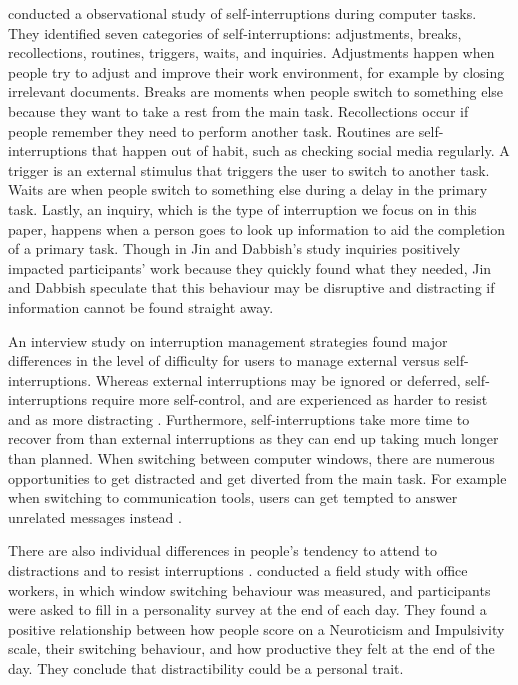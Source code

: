\citet{Jin2009} conducted a observational study of self-interruptions during computer tasks. They identified seven categories of self-interruptions: adjustments, breaks, recollections, routines, triggers, waits, and inquiries. Adjustments happen when people try to adjust and improve their work environment, for example by closing irrelevant documents. Breaks are moments when people switch to something else because they want to take a rest from the main task. Recollections occur if people remember they need to perform another task. Routines are self-interruptions that happen out of habit, such as checking social media regularly. A trigger is an external stimulus that triggers the user to switch to another task. Waits are when people switch to something else during a delay in the primary task. Lastly, an inquiry, which is the type of interruption we focus on in this paper, happens when a person goes to look up information to aid the completion of a primary task. Though in Jin and Dabbish’s study inquiries positively impacted participants’ work because they quickly found what they needed, Jin and Dabbish speculate that this behaviour may be disruptive and distracting if information cannot be found straight away.

An interview study on interruption management strategies found major differences in the level of difficulty for users to manage external versus self-interruptions.  Whereas external interruptions may be ignored or deferred, self-interruptions require more self-control, and are experienced as harder to resist and as more distracting \citep{Kim2017}. Furthermore, self-interruptions take more time to recover from than external interruptions as they can end up taking much longer than planned. When switching between computer windows, there are numerous opportunities to get distracted and get diverted from the main task. For example when switching to communication tools, users can get tempted to answer unrelated messages instead \citep{Mark2012}. %

There are also individual differences in people's tendency to attend to distractions and to resist interruptions \citep{Mark2016a, Lyngs2018}. \citet{Mark2016a} conducted a field study with office workers, in which window switching behaviour was measured, and participants were asked to fill in a personality survey at the end of each day. They found a positive relationship between how people score on a Neuroticism and Impulsivity scale, their switching behaviour, and how productive they felt at the end of the day. They conclude that distractibility could be a personal trait. 

